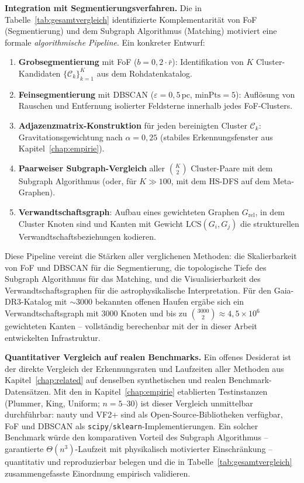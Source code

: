﻿\documentclass[a4paper,12pt]{report}
\theoremstyle{definition}
\begin{document}
\textbf{Integration mit Segmentierungsverfahren.} Die in Tabelle~\ref{tab:gesamtvergleich} identifizierte Komplementarität von FoF (Segmentierung) und dem Subgraph Algorithmus (Matching) motiviert eine formale \emph{algorithmische Pipeline}. Ein konkreter Entwurf:

\begin{enumerate}
    \item \textbf{Grobsegmentierung} mit FoF ($b = 0{,}2 \cdot \bar{r}$): Identifikation von $K$ Cluster-Kandidaten $\{\mathcal{C}_k\}_{k=1}^K$ aus dem Rohdatenkatalog.
    \item \textbf{Feinsegmentierung} mit DBSCAN ($\varepsilon = 0{,}5\,\mathrm{pc}$, $\mathrm{minPts} = 5$): Auflösung von Rauschen und Entfernung isolierter Feldsterne innerhalb jedes FoF-Clusters.
    \item \textbf{Adjazenzmatrix-Konstruktion} für jeden bereinigten Cluster $\mathcal{C}_k$: Gravitationsgewichtung nach $\alpha = 0{,}25$ (stabiles Erkennungsfenster aus Kapitel~\ref{chap:empirie}).
    \item \textbf{Paarweiser Subgraph-Vergleich} aller $\binom{K}{2}$ Cluster-Paare mit dem Subgraph Algorithmus (oder, für $K \gg 100$, mit dem HS-DFS auf dem Meta-Graphen).
    \item \textbf{Verwandtschaftsgraph}: Aufbau eines gewichteten Graphen $G_\mathrm{rel}$, in dem Cluster Knoten sind und Kanten mit Gewicht LCS$(G_i, G_j)$ die strukturellen Verwandtschaftsbeziehungen kodieren.
\end{enumerate}

Diese Pipeline vereint die Stärken aller verglichenen Methoden: die Skalierbarkeit von FoF und DBSCAN für die Segmentierung, die topologische Tiefe des Subgraph Algorithmus für das Matching, und die Visualisierbarkeit des Verwandtschaftsgraphen für die astrophysikalische Interpretation. Für den Gaia-DR3-Katalog mit $\sim 3000$ bekannten offenen Haufen ergäbe sich ein Verwandtschaftsgraph mit $3000$ Knoten und bis zu $\binom{3000}{2} \approx 4{,}5 \times 10^6$ gewichteten Kanten -- vollständig berechenbar mit der in dieser Arbeit entwickelten Infrastruktur.

\textbf{Quantitativer Vergleich auf realen Benchmarks.} Ein offenes Desiderat ist der direkte Vergleich der Erkennungsraten und Laufzeiten aller Methoden aus Kapitel~\ref{chap:related} auf denselben synthetischen und realen Benchmark-Datensätzen. Mit den in Kapitel~\ref{chap:empirie} etablierten Testinstanzen (Plummer, King, Uniform; $n = 5$--$30$) ist dieser Vergleich unmittelbar durchführbar: nauty und VF2+ sind als Open-Source-Bibliotheken verfügbar, FoF und DBSCAN als \texttt{scipy}/\texttt{sklearn}-Implementierungen. Ein solcher Benchmark würde den komparativen Vorteil des Subgraph Algorithmus -- garantierte $\Theta(n^3)$-Laufzeit mit physikalisch motivierter Einschränkung -- quantitativ und reproduzierbar belegen und die in Tabelle~\ref{tab:gesamtvergleich} zusammengefasste Einordnung empirisch validieren.
\end{document}
